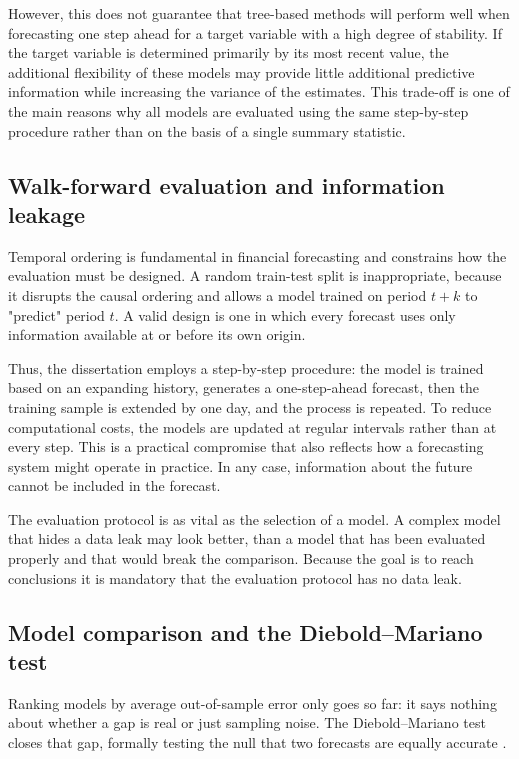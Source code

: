 However, this does not guarantee that tree-based methods will perform well when forecasting one step ahead for a target variable with a high degree of stability. If the target variable is determined primarily by its most recent value, the additional flexibility of these models may provide little additional predictive information while increasing the variance of the estimates. This trade-off is one of the main reasons why all models are evaluated using the same step-by-step procedure rather than on the basis of a single summary statistic.

\subsection{Walk-forward evaluation and information leakage}

Temporal ordering is fundamental in financial forecasting and constrains how the evaluation must be designed. A random train-test split is inappropriate, because it disrupts the causal ordering and allows a model trained on period $t + k$ to "predict" period $t$. A valid design is one in which every forecast uses only information available at or before its own origin.

Thus, the dissertation employs a step-by-step procedure: the model is trained based on an expanding history, generates a one-step-ahead forecast, then the training sample is extended by one day, and the process is repeated. To reduce computational costs, the models are updated at regular intervals rather than at every step. This is a practical compromise that also reflects how a forecasting system might operate in practice. In any case, information about the future cannot be included in the forecast.

The evaluation protocol is as vital as the selection of a model. A complex model that hides a data leak may look better, than a model that has been evaluated properly and that would break the comparison. Because the goal is to reach conclusions it is mandatory that the evaluation protocol has no data leak.

\subsection{Model comparison and the Diebold--Mariano test}

Ranking models by average out-of-sample error only goes so far: it says nothing about whether a gap is real or just sampling noise. The Diebold--Mariano test closes that gap, formally testing the null that two forecasts are equally accurate \cite{diebold1995}.

